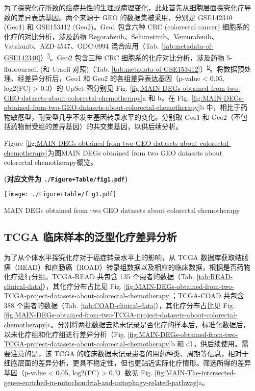 \documentclass[
]{article}
\begin{document}
为了探究化疗所致的癌症共性的生理或病理变化，此处首先从细胞层面探究化疗导致的差异表达基因。两个来源于 GEO 的数据集被采用，分别是 GSE142340 (Geo1) 和 GSE153412 (Geo2)。Geo1 包含六种 CRC (colorectal cancer) 细胞系的化疗的对比分析，涉及药物 Regorafenib、Selumetinib、Vemurafenib、Vatalanib、AZD-4547、GDC-0994 混合应用（Tab. \ref{tab:metadata-of-GSE142340}）\textsuperscript{\protect\hyperlink{ref-OptimizedLowDZoetem2020}{5}}。Geo2 包含三种 CRC 细胞系的化疗对比分析，涉及药物 5-fluorouracil (和 Uracil 对照)（Tab. \ref{tab:metadata-of-GSE153412}）\textsuperscript{\protect\hyperlink{ref-DownregulationChauvi2022}{6}}。将数据预处理、经差异分析后，Geo1 和 Geo2 的各组差异表达基因（p-value \textless{} 0.05, \textbar log2(FC)\textbar{} \textgreater{} 0.3）的 UpSet 图分别见 Fig. \ref{fig:MAIN-DEGs-obtained-from-two-GEO-datasets-about-colorectal-chemotherapy}a 和 b。在 Fig. \ref{fig:MAIN-DEGs-obtained-from-two-GEO-datasets-about-colorectal-chemotherapy}b 中，相比于药物敏感型，耐受型几乎不发生基因转录水平的变化。分别取 Geo1 和 Geo2（不包括药物耐受组的差异基因）的共交集基因，以供后续分析。

Figure \ref{fig:MAIN-DEGs-obtained-from-two-GEO-datasets-about-colorectal-chemotherapy}为图MAIN DEGs obtained from two GEO datasets about colorectal chemotherapy概览。

\textbf{(对应文件为 \texttt{./Figure+Table/fig1.pdf})}

\def\@captype{figure}
\begin{center}
\texttt{[image: ./Figure+Table/fig1.pdf]}
\caption{MAIN DEGs obtained from two GEO datasets about colorectal chemotherapy}\label{fig:MAIN-DEGs-obtained-from-two-GEO-datasets-about-colorectal-chemotherapy}
\end{center}

\hypertarget{tcgaDiff}{%
\subsection{TCGA 临床样本的泛型化疗差异分析}\label{tcgaDiff}}

为了从个体水平探究化疗对于癌症转录水平上的影响，从 TCGA 数据库获取结肠癌（READ）和直肠癌（ROAD）转录组数据以及相应的临床数据，根据是否药物化疗进行分组。TCGA-READ 共包含 135 个患者的数据（Tab. \ref{tab:READ-clinical-data}），其化疗分布占比见 Fig. \ref{fig:MAIN-DEGs-obtained-from-two-TCGA-project-datasets-about-colorectal-chemotherapy}；TCGA-COAD 共包含 388 个患者的数据（Tab. \ref{tab:COAD-clinical-data}），其化疗分布占比见 Fig. \ref{fig:MAIN-DEGs-obtained-from-two-TCGA-project-datasets-about-colorectal-chemotherapy}c。分别将两批数据去除未记录是否化疗的样本后，标准化数据后，以未化疗组和化疗组进行差异分析（Fig. \ref{fig:MAIN-DEGs-obtained-from-two-TCGA-project-datasets-about-colorectal-chemotherapy}b 和 d），供后续使用。需要注意的是，该 TCGA 的临床数据未记录患者的用药种类、周期等信息，相对于细胞层面的差异分析，更具不稳定性，但也更贴近实际化疗情形。筛选所得的差异基因（p-value \textless{} 0.05, \textbar log2(FC)\textbar{} \textgreater{} 0.3）数见 Fig. \ref{fig:MAIN-The-intersected-genes-enriched-in-mitochondrial-and-autophagy-related-pathway}a。
\end{document}
